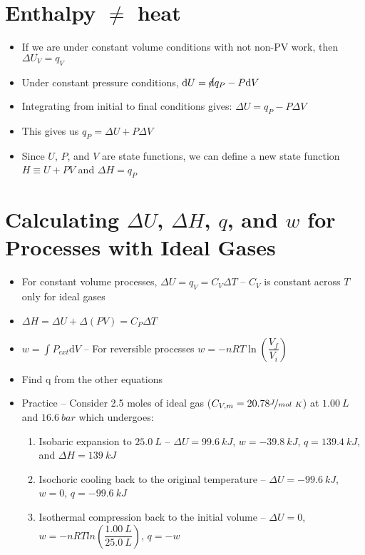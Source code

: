 \documentclass[12pt, openany, letterpaper]{memoir}
\begin{document}
\section*{Enthalpy $\neq$ heat}
\begin{itemize}
	\item If we are under constant volume conditions with not non-PV work, then $\Delta U_V=q_V$
	\item Under constant pressure conditions, $\mathrm{d}U = \cancel{\mathrm{d}}q_P - P\mathrm{d}V$
	\item Integrating from initial to final conditions gives: $\Delta U = q_{P} - P\Delta V$
	\item This gives us $q_{P} = \Delta U + P\Delta V$
	\item Since $U$, $P$, and $V$ are state functions, we can define a new state function $H\equiv U+PV$ and $\Delta H = q_P$
\end{itemize}
\section*{Calculating $\Delta U$, $\Delta H$, $q$, and $w$ for Processes with Ideal Gases}
\begin{itemize}
	\item For constant volume processes, $\Delta U = q_V = C_V\Delta T$ -- $C_V$ is constant across $T$ only for ideal gases
	\item $\Delta H = \Delta U + \Delta (PV) = C_P\Delta T$
	\item $w=\int\!P_{ext}\mathrm{d}V$ -- For reversible processes $w=-nRT\ln\left(\dfrac{V_f}{V_i}\right)$
	\item Find q from the other equations
	\item Practice -- Consider 2.5 moles of ideal gas ($C_{V,m}=20.78\nicefrac{J}{mol~K}$) at $1.00~L$ and $16.6~bar$ which undergoes:
	\begin{enumerate}
		\item Isobaric expansion to $25.0~L$ -- $\Delta U = 99.6~kJ$, $w=-39.8~kJ$, $q=139.4~kJ$, and $\Delta H=139~kJ$
		\item Isochoric cooling back to the original temperature -- $\Delta U = -99.6~kJ$, $w=0$, $q=-99.6~kJ$
		\item Isothermal compression back to the initial volume -- $\Delta U = 0$, $w=-nRTln\left(\dfrac{1.00~L}{25.0~L}\right)$, $q=-w$
	\end{enumerate}
\end{itemize}
\end{document}
